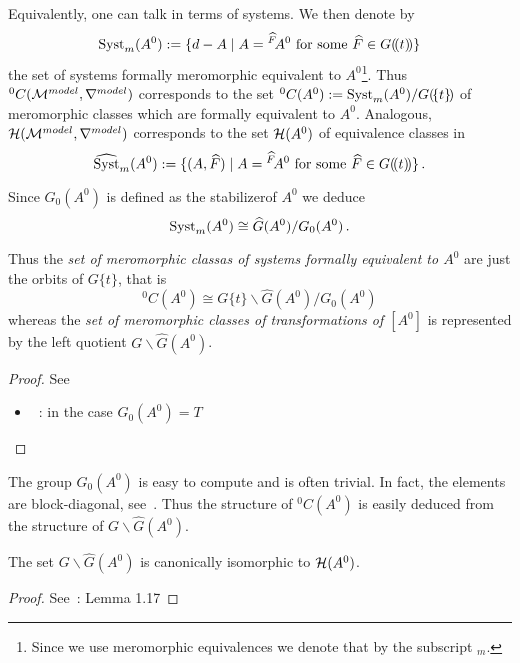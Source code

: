 Equivalently, one can talk in terms of systems. We then denote by
\[
  \operatorname{Syst}_m(A^0):=\{d-A
    \mid A={}^{\widehat F}\!A^0 \text{ for some } \widehat F\in G(\!(t)\!)\}
\]
the set of systems formally meromorphic equivalent to $A^0$\footnote{Since we
use meromorphic equivalences we denote that by the subscript ${}_m$.}.
Thus ${}^0C(\mathcal{M}^{model},\nabla^{model})$ corresponds to
the set ${}^0C(A^0):=\operatorname{Syst}_m(A^0)/G(\!\{t\}\!)$ of meromorphic classes which
are formally equivalent to $A^0$.
Analogous, $\mathcal{H}(\mathcal{M}^{model},\nabla^{model})$ corresponds to the set $\mathcal{H}(A^0)$ of
equivalence classes in
\[
  \widehat{\operatorname{Syst}}_m(A^0):=\{(A,\widehat F)
    \mid A={}^{\widehat F}\!A^0 \text{ for some } \widehat F\in G(\!(t)\!)\} \,.
\]

\begin{lem}
  Since $G_0(A^0)$ is defined as the stabilizer\TODO[correct?] of $A^0$ we deduce
  \[
    \operatorname{Syst}_m(A^0)\cong \widehat G(A^0)/G_0(A^0) \,.
  \]
  \begin{cor}
    Thus the \emph{set of meromorphic classas of systems formally equivalent
      to $A^0$} are just the orbits of $G\{t\}$, that is
    \[
      {}^0C(A^0)\cong G\{t\}\backslash\hat G(A^0)/G_0(A^0)
    \]
    whereas the \emph{set of meromorphic classes of transformations of $[A^0]$}
    is represented by the left quotient $G\backslash\hat G(A^0)$.
  \end{cor}
\end{lem}
\begin{proof}
  See
  \begin{itemize}
    \item~\cite[6]{thboalch}: in the case $G_0(A^0)=T$
  \end{itemize}
\end{proof}

The group $G_0(A^0)$ is easy to compute and is often trivial. In fact, the
elements are block-diagonal, see~\cite[77]{Loday2014}.
Thus the structure of ${}^0C(A^0)$ is easily deduced from the structure of
$G\backslash\hat G(A^0)$.

\begin{lem}
  The set $G\backslash\hat G(A^0)$ is canonically isomorphic to $\mathcal{H}(A^0)$.
\end{lem}
\begin{proof}
  See~\cite{thboalch}: Lemma 1.17
\end{proof}

